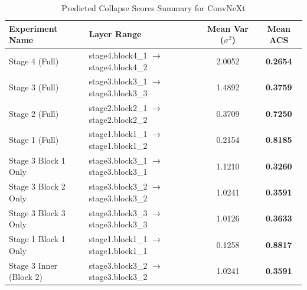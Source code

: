\begin{table}[h]
\caption{Predicted Collapse Scores Summary for ConvNeXt}
\label{tab:acs_summary_convnext}
\begin{tabular}{llcc}
\toprule
Experiment Name & Layer Range & Mean Var ($\sigma^2$) & Mean ACS \\
\midrule
Stage 4 (Full) & stage4.block4\_1 $\to$ stage4.block4\_2 & 2.0052 & \textbf{0.2654} \\
Stage 3 (Full) & stage3.block3\_1 $\to$ stage3.block3\_3 & 1.4892 & \textbf{0.3759} \\
Stage 2 (Full) & stage2.block2\_1 $\to$ stage2.block2\_2 & 0.3709 & \textbf{0.7250} \\
Stage 1 (Full) & stage1.block1\_1 $\to$ stage1.block1\_2 & 0.2154 & \textbf{0.8185} \\
Stage 3 Block 1 Only & stage3.block3\_1 $\to$ stage3.block3\_1 & 1.1210 & \textbf{0.3260} \\
Stage 3 Block 2 Only & stage3.block3\_2 $\to$ stage3.block3\_2 & 1.0241 & \textbf{0.3591} \\
Stage 3 Block 3 Only & stage3.block3\_3 $\to$ stage3.block3\_3 & 1.0126 & \textbf{0.3633} \\
Stage 1 Block 1 Only & stage1.block1\_1 $\to$ stage1.block1\_1 & 0.1258 & \textbf{0.8817} \\
Stage 3 Inner (Block 2) & stage3.block3\_2 $\to$ stage3.block3\_2 & 1.0241 & \textbf{0.3591} \\
\bottomrule
\end{tabular}
\end{table}
